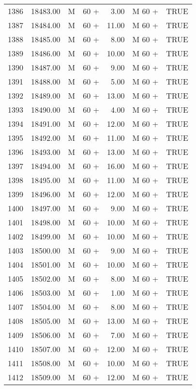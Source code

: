 \begin{table}[ht]
\begin{tabular}{rrllrll}
  1386 & 18483.00 & M & 60 + & 3.00 & M 60 + & TRUE \\ 
  1387 & 18484.00 & M & 60 + & 11.00 & M 60 + & TRUE \\ 
  1388 & 18485.00 & M & 60 + & 8.00 & M 60 + & TRUE \\ 
  1389 & 18486.00 & M & 60 + & 10.00 & M 60 + & TRUE \\ 
  1390 & 18487.00 & M & 60 + & 9.00 & M 60 + & TRUE \\ 
  1391 & 18488.00 & M & 60 + & 5.00 & M 60 + & TRUE \\ 
  1392 & 18489.00 & M & 60 + & 13.00 & M 60 + & TRUE \\ 
  1393 & 18490.00 & M & 60 + & 4.00 & M 60 + & TRUE \\ 
  1394 & 18491.00 & M & 60 + & 12.00 & M 60 + & TRUE \\ 
  1395 & 18492.00 & M & 60 + & 11.00 & M 60 + & TRUE \\ 
  1396 & 18493.00 & M & 60 + & 13.00 & M 60 + & TRUE \\ 
  1397 & 18494.00 & M & 60 + & 16.00 & M 60 + & TRUE \\ 
  1398 & 18495.00 & M & 60 + & 11.00 & M 60 + & TRUE \\ 
  1399 & 18496.00 & M & 60 + & 12.00 & M 60 + & TRUE \\ 
  1400 & 18497.00 & M & 60 + & 9.00 & M 60 + & TRUE \\ 
  1401 & 18498.00 & M & 60 + & 10.00 & M 60 + & TRUE \\ 
  1402 & 18499.00 & M & 60 + & 10.00 & M 60 + & TRUE \\ 
  1403 & 18500.00 & M & 60 + & 9.00 & M 60 + & TRUE \\ 
  1404 & 18501.00 & M & 60 + & 10.00 & M 60 + & TRUE \\ 
  1405 & 18502.00 & M & 60 + & 8.00 & M 60 + & TRUE \\ 
  1406 & 18503.00 & M & 60 + & 1.00 & M 60 + & TRUE \\ 
  1407 & 18504.00 & M & 60 + & 8.00 & M 60 + & TRUE \\ 
  1408 & 18505.00 & M & 60 + & 13.00 & M 60 + & TRUE \\ 
  1409 & 18506.00 & M & 60 + & 7.00 & M 60 + & TRUE \\ 
  1410 & 18507.00 & M & 60 + & 12.00 & M 60 + & TRUE \\ 
  1411 & 18508.00 & M & 60 + & 10.00 & M 60 + & TRUE \\ 
  1412 & 18509.00 & M & 60 + & 12.00 & M 60 + & TRUE \\ 

\end{tabular}
\end{table}
